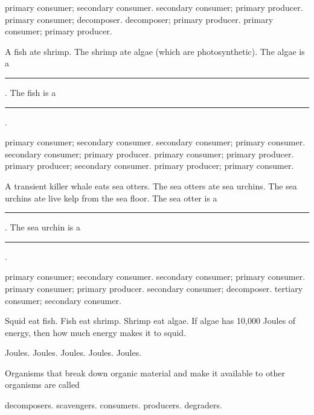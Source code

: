 \begin{choices}	
\correctchoice primary consumer; secondary consumer. %
\choice secondary consumer; primary producer. %
\choice primary consumer; decomposer. %
\choice decomposer; primary producer. %
\choice primary consumer; primary producer. %
\end{choices}

\question
A fish ate shrimp. The shrimp ate algae (which are photosynthetic).  The algae is a \rule{1in}{0.4pt}. The fish is a \rule{1in}{0.4pt}.

\begin{choices}	
\choice primary consumer; secondary consumer. %
\choice secondary consumer; primary consumer. %
\choice secondary consumer; primary producer. %
\choice primary consumer; primary producer. %
\correctchoice primary producer; secondary consumer. %
\choice primary producer; primary consumer. %
\end{choices}

\question
A transient killer whale eats sea otters. The sea otters ate sea urchins. The sea urchins ate live kelp from the sea floor.  The sea otter is a \rule{1in}{0.4pt}. The sea urchin is a \rule{1in}{0.4pt}.	

\begin{choices}
\choice primary consumer; secondary consumer. %
\correctchoice secondary consumer; primary consumer. %
\choice primary consumer; primary producer. %
\choice secondary consumer; decomposer. %
\choice tertiary consumer; secondary consumer. %
\end{choices}


\question
Squid eat fish.  Fish eat shrimp. Shrimp eat algae.  If algae has 10,000 Joules of energy, then how much energy makes it to squid.

\begin{choices}	
 Joules. %
 Joules. %
 Joules. %
 Joules. %
 Joules. %
\end{choices}


\question
Organisms that break down organic material and make it available to other organisms are called

\begin{choices}
\correctchoice decomposers. %
\choice scavengers. %
\choice consumers.  %
\choice producers. %
\choice degraders. %
\end{choices}


